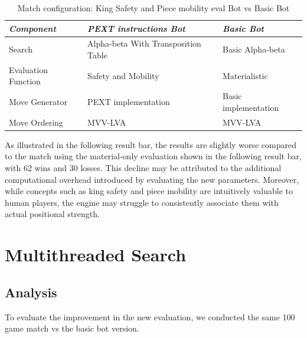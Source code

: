 \begin{table}
    \centering
    \begin{tabular}{|p{4cm}|p{4cm}|p{4cm}|}
    \hline
    \textit{Component}         & \textit{PEXT instructions Bot}  & \textit{Basic Bot}     \\ \hline
    Search                     & Alpha-beta With Transposition Table          & Basic Alpha-beta           \\ \hline
    Evaluation Function        & Safety and Mobility                      & Materialistic      \\ \hline
    Move Generator             & PEXT implementation              & Basic implementation   \\ \hline
    Move Ordering              & MVV-LVA                           & MVV-LVA                \\ \hline
    \end{tabular}
    \caption{Match configuration: King Safety and Piece mobility eval Bot vs Basic Bot}\label{tab:safety_mobility_vs_basic}
\end{table}

\noindent As illustrated in the following result bar, the results are slightly worse compared to the match using the material-only evaluation shown in the following result bar, with 62 wins and 30 losses. This decline may be attributed to the additional computational overhead introduced by evaluating the new parameters. Moreover, while concepts such as king safety and piece mobility are intuitively valuable to human players, the engine may struggle to consistently associate them with actual positional strength.

\begin{center}
\medskip
\end{center}

\section{Multithreaded Search}

\subsection{Analysis}

To evaluate the improvement in the new evaluation, we conducted the same 100 game match vs the basic bot version. 

\begin{center}
\medskip
\end{center}

